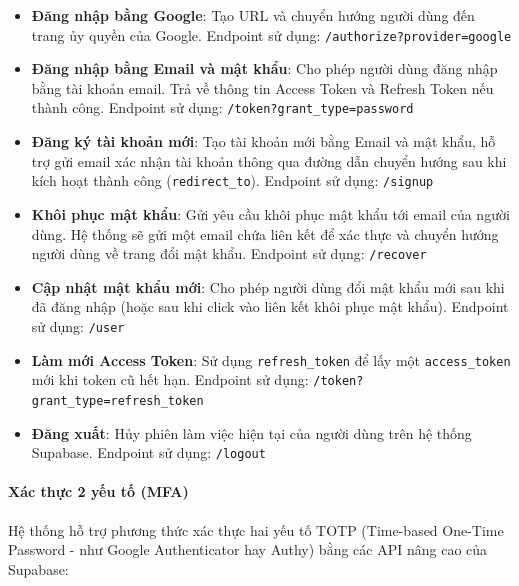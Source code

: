 \begin{itemize}

\item \textbf{Đăng nhập bằng Google}:
Tạo URL và chuyển hướng người dùng đến trang ủy quyền của Google.
Endpoint sử dụng: \texttt{/authorize?provider=google}

\item \textbf{Đăng nhập bằng Email và mật khẩu}:
Cho phép người dùng đăng nhập bằng tài khoản email. Trả về thông tin Access Token và Refresh Token nếu thành công.
Endpoint sử dụng: \texttt{/token?grant\_type=password}

\item \textbf{Đăng ký tài khoản mới}:
Tạo tài khoản mới bằng Email và mật khẩu, hỗ trợ gửi email xác nhận tài khoản thông qua đường dẫn chuyển hướng sau khi kích hoạt thành công (\texttt{redirect\_to}).
Endpoint sử dụng: \texttt{/signup}

\item \textbf{Khôi phục mật khẩu}:
Gửi yêu cầu khôi phục mật khẩu tới email của người dùng. Hệ thống sẽ gửi một email chứa liên kết để xác thực và chuyển hướng người dùng về trang đổi mật khẩu.
Endpoint sử dụng: \texttt{/recover}

\item \textbf{Cập nhật mật khẩu mới}:
Cho phép người dùng đổi mật khẩu mới sau khi đã đăng nhập (hoặc sau khi click vào liên kết khôi phục mật khẩu).
Endpoint sử dụng: \texttt{/user}

\item \textbf{Làm mới Access Token}:
Sử dụng \texttt{refresh\_token} để lấy
một \texttt{access\_token} mới
khi token cũ hết hạn.
Endpoint sử dụng: \texttt{/token?grant\_type=refresh\_token}

\item \textbf{Đăng xuất}:
Hủy phiên làm việc hiện tại của người dùng trên hệ thống Supabase.
Endpoint sử dụng: \texttt{/logout}

\end{itemize}

\paragraph{Xác thực 2 yếu tố (MFA)}

Hệ thống hỗ trợ phương thức
xác thực hai yếu tố TOTP (Time-based One-Time Password - như Google Authenticator hay Authy)
bằng các API nâng cao của Supabase:

